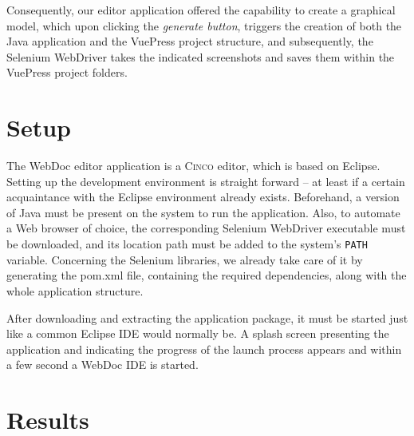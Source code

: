Consequently, our editor application offered the capability to create a graphical model, which upon clicking the \textit{generate button}, triggers the creation of both the Java application and the VuePress project structure, and subsequently, the Selenium WebDriver takes the indicated screenshots and saves them within the VuePress project folders.

\section{Setup}\label{sec:setup}

The WebDoc editor application is a \textsc{Cinco} editor, which is based on Eclipse. Setting up the development environment is straight forward -- at least if a certain acquaintance with the Eclipse environment already exists. Beforehand, a version of Java must be present on the system to run the application. Also, to automate a Web browser of choice, the corresponding Selenium WebDriver executable must be downloaded, and its location path must be added to the system's \lstinline{PATH} variable. Concerning the Selenium libraries, we already take care of it by generating the pom.xml file, containing the required dependencies, along with the whole application structure.

After downloading and extracting the application package, it must be started just like a common Eclipse IDE would normally be. A splash screen presenting the application and indicating the progress of the launch process appears and within a few second a WebDoc IDE is started. 

\section{Results}\label{sec:res}
